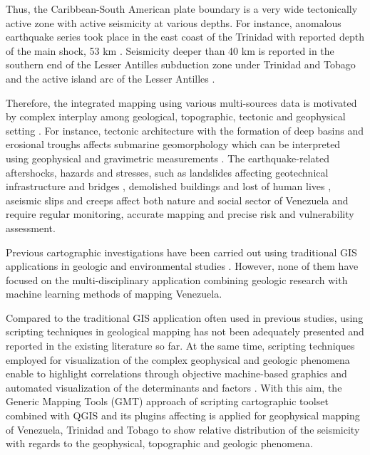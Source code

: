 \documentclass[sustainability,article,submit,pdftex,moreauthors]{Definitions/mdpi}
\begin{document}
Thus, the Caribbean-South American plate boundary is a very wide tectonically active zone \cite{Audemard1993,Backe} with active seismicity at various depths. For instance, anomalous earthquake series took place in the east coast of the Trinidad with reported depth of the main shock, 53 km \cite{Marshall}. Seismicity deeper than 40 km is reported in the southern end of the Lesser Antilles subduction zone under Trinidad and Tobago and the active island arc of the Lesser Antilles \cite{Reinoza}. 

Therefore, the integrated mapping using various multi-sources data is motivated by complex interplay among geological, topographic, tectonic and geophysical setting \cite{Lemenkova2021a}. For instance, tectonic architecture with the formation of deep basins and erosional troughs affects submarine geomorphology \cite{Lemenkova2021c} which can be interpreted using geophysical and gravimetric measurements \cite{Lemenkova2021e}. The earthquake-related aftershocks, hazards and stresses, such as landslides affecting geotechnical infrastructure and bridges \cite{Salcedo}, demolished buildings and lost of human lives \cite{Rodriguez2018}, aseismic slips and creeps \cite{Pousse2016} affect both nature and social sector of Venezuela and require regular monitoring,  accurate mapping and precise risk and vulnerability assessment. 

Previous cartographic investigations have been carried out using traditional GIS applications in geologic and environmental studies \citep{Gonzalez,Klauco2013,Klauco2017,Lemenkova2020d,Hackley,Schmitz2021,Sun}. However, none of them have focused on the multi-disciplinary application combining geologic research with machine learning methods of mapping Venezuela. 

Compared to the traditional GIS application often used in previous studies, using scripting techniques in geological mapping has not been adequately presented and reported in the existing literature so far. At the same time, scripting techniques employed for visualization of the complex geophysical and geologic phenomena enable to highlight correlations through objective machine-based graphics and automated visualization of the determinants and factors \citep{Lemenkov2021a,Lemenkov2021b}. With this aim, the Generic Mapping Tools (GMT) approach of scripting cartographic toolset combined with QGIS and its plugins affecting is applied for geophysical mapping of Venezuela, Trinidad and Tobago to show relative distribution of the seismicity with regards to the geophysical, topographic and geologic phenomena. 
\end{document}
